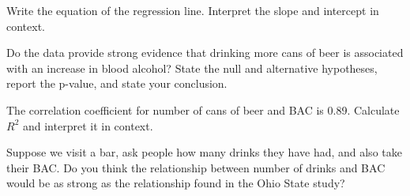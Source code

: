 {\begin{parts}
\item Write the equation of the regression line. Interpret the slope and intercept in context.
\item Do the data provide strong evidence that drinking more cans of beer is associated with an increase in blood alcohol? State the null and alternative hypotheses, report the p-value, and state your conclusion.
\item The correlation coefficient for number of cans of beer and BAC is 0.89. Calculate $R^2$ and interpret it in context.
\item Suppose we visit a bar, ask people how many drinks they have had, and also take their BAC. Do you think the relationship between number of drinks and BAC would be as strong as the relationship found in the Ohio State study?
\end{parts}
}{}


